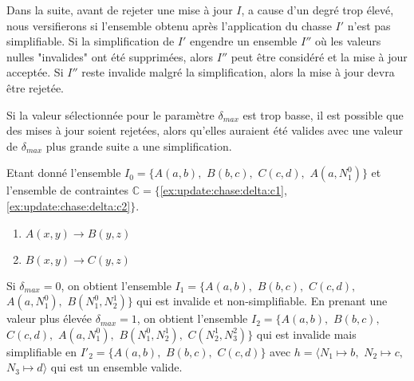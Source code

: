 Dans la suite, avant de rejeter une mise à jour $I$, a cause d'un degré trop élevé, nous versifierons si l'ensemble obtenu après l'application du chasse $I'$ n'est pas simplifiable.
Si la simplification de $I'$ engendre un ensemble $I''$ où les valeurs nulles "invalides" ont été supprimées, alors $I''$ peut être considéré et la mise à jour acceptée.
Si $I''$ reste invalide malgré la simplification, alors la mise à jour devra être rejetée.

Si la valeur sélectionnée pour le paramètre $\delta_{max}$ est trop basse, il est possible que des mises à jour soient rejetées, alors qu'elles auraient été valides avec une valeur de $\delta_{max}$ plus grande suite a une simplification.

\begin{example}
    \label{ex:update:chase:delta}
    Etant donné l'ensemble $I_0 = \{A(a, b),$ $B(b, c),$ $C(c, d),$ $A(a, N_1^0)\}$ et l'ensemble de contraintes $\mathbb{C} = \{$\ref{ex:update:chase:delta:c1}, \ref{ex:update:chase:delta:c2}$\}$.
    \begin{multicols}{2}
        \begin{enumerate}[label=\textbf{$c_\arabic*$ :},ref=$c_\arabic*$]
            \centering
            \item $A(x, y) \to B(y, z)$ \label{ex:update:chase:delta:c1}
            \item $B(x, y) \to C(y, z)$ \label{ex:update:chase:delta:c2}
        \end{enumerate}
    \end{multicols}
    Si $\delta_{max} = 0$, on obtient l'ensemble $I_1 = \{A(a, b),$ $B(b, c),$ $C(c, d),$ $A(a, N_1^0),$ $B(N_1^0, N_2^1)\}$ qui est invalide et non-simplifiable.
    En prenant une valeur plus élevée $\delta_{max} = 1$, on obtient l'ensemble $I_2 = \{A(a, b),$ $B(b, c),$ $C(c, d),$ $A(a, N_1^0),$ $B(N_1^0, N_2^1),$ $C(N_2^1, N_3^2)\}$ qui est invalide mais simplifiable en $I'_2 = \{A(a, b),$ $B(b, c),$ $C(c, d)\}$ avec $h = \langle N_1 \mapsto b,$ $N_2 \mapsto c,$ $N_3 \mapsto d \rangle$ qui est un ensemble valide.
\end{example}

